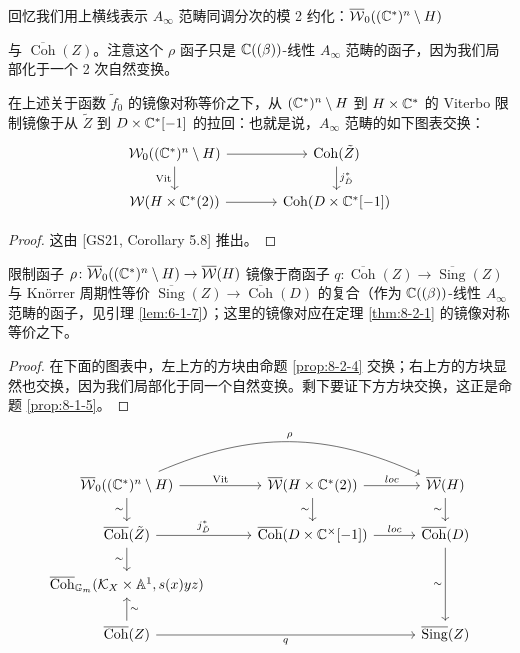 回忆我们用上横线表示 $A_\infty$ 范畴同调分次的模 2 约化：$\overline{\mathcal{W}}_0((\mathbb{C}^*)^n\setminus H)$

与 $\overline{\operatorname{Coh}}(Z)$。注意这个 $\rho$ 函子只是 $\mathbb{C}((\beta))$-线性 $A_\infty$ 范畴的函子，因为我们局部化于一个 2 次自然变换。

\begin{proposition}\label{prop:8-2-4}
在上述关于函数 $\tilde f_0$ 的镜像对称等价之下，从 $(\mathbb{C}^*)^n\setminus H$ 到 $H\times\mathbb{C}^*$ 的 Viterbo 限制镜像于从 $\tilde Z$ 到 $D\times\mathbb{C}^*[-1]$ 的拉回：也就是说，$A_\infty$ 范畴的如下图表交换：
\[
\begin{tikzcd}[column sep=3.6em, row sep=1.7em]
\cW_0((\C^*)^n\setminus H) \arrow[r] \arrow[d, "\mathrm{Vit}"'] & \operatorname{Coh}(\tilde Z) \arrow[d, "j_{\tilde D}^*"] \\
\cW(H\times\C^*(2)) \arrow[r] & \operatorname{Coh}(D\times\C^*[-1])
\end{tikzcd}
\]
\end{proposition}

\begin{proof}
这由 [GS21, Corollary 5.8] 推出。
\end{proof}


\begin{theorem}\label{thm:8-2-5}
限制函子 $\rho\colon\overline{\mathcal{W}}_0((\mathbb{C}^*)^n\setminus H)\to\overline{\mathcal{W}}(H)$ 镜像于商函子 $q\colon\overline{\operatorname{Coh}}(Z)\to\overline{\operatorname{Sing}}(Z)$ 与 Kn{\"o}rrer 周期性等价 $\overline{\operatorname{Sing}}(Z)\to\overline{\operatorname{Coh}}(D)$ 的复合（作为 $\mathbb{C}((\beta))$-线性 $A_\infty$ 范畴的函子，见引理 \ref{lem:6-1-7}）；这里的镜像对应在定理 \ref{thm:8-2-1} 的镜像对称等价之下。
\end{theorem}

\begin{proof}
在下面的图表中，左上方的方块由命题 \ref{prop:8-2-4} 交换；右上方的方块显然也交换，因为我们局部化于同一个自然变换。剩下要证下方方块交换，这正是命题 \ref{prop:8-1-5}。
\end{proof}

\[
\begin{tikzcd}[column sep=3.0em, row sep=1.7em]
\overline{\cW}_0((\C^*)^n\setminus H) \arrow[r, "\mathrm{Vit}"] \arrow[rr, bend left=24, "\rho"] \arrow[d, "{\sim}"'] & \overline{\cW}(H\times\C^*(2)) \arrow[r, "loc"] \arrow[d, "{\sim}"'] & \overline{\cW}(H) \arrow[d, "{\sim}"'] \\
\overline{\operatorname{Coh}}(\tilde Z) \arrow[r, "j_{\tilde D}^*"] \arrow[d, "{\sim}"'] & \overline{\operatorname{Coh}}(D\times\C^\times[-1]) \arrow[r, "loc"] & \overline{\operatorname{Coh}}(D) \arrow[dd, "{\sim}"'] \\
\overline{\operatorname{Coh}}_{\mathbb G_m}(\cK_X\times\mathbb A^1,s(x)yz) & & \\
\overline{\operatorname{Coh}}(Z) \arrow[u, "{\sim}"'] \arrow[rr, "q"'] & & \overline{\operatorname{Sing}}(Z)
\end{tikzcd}
\]

